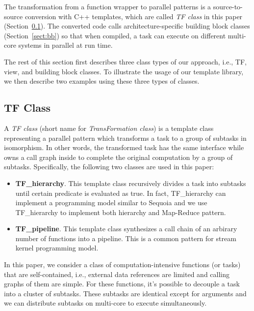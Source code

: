 The transformation from a function wrapper to parallel patterns is a
source-to-source conversion with C++ templates, which are called \emph{TF
class} in this paper (Section~\ref{sect:tf}).  The converted code calls
architecture-specific building block classes (Section~\ref{sect:bb}) so that
when compiled, a task can execute on
different multi-core systems in parallel at run time. 

The rest of this section first describes three class types of our approach, i.e.,
TF, view, and building block classes. 
To illustrate the usage of our template library, we then describe two examples
using these three types of classes.

\subsection{TF Class}
\label{sect:tf}

A \textit{TF class} (short name for \textit{TransFormation class}) is a template
class representing a parallel pattern which transforms a task to a group of
subtasks in isomorphism. In other words, the transformed task has the same interface
while owns a call graph inside to complete the original computation by a
group of subtasks. Specifically, the following two classes are used in this paper: 

\begin{itemize} 
\item \textbf{TF\_hierarchy}. This template class recursively divides a task into subtasks
until certain predicate is evaluated as true. %
In fact, TF\_hierarchy can implement a programming model similar to Sequoia and
we use TF\_hierarchy to implement both hierarchy and Map-Reduce pattern.

\item \textbf{TF\_pipeline}. This template class synthesizes a call chain of an
arbirary number of functions into a pipeline. This is a common pattern for
stream kernel programming model.
\end{itemize} 


In this paper, we consider a class of computation-intensive functions (or tasks) that are 
self-contained, i.e., external data references are limited and
calling graphs of them are simple. For these functions, it's possible to
decouple a task into a cluster of subtasks. These subtasks are identical
except for arguments and we can distribute subtasks on multi-core to execute simultaneously. 

